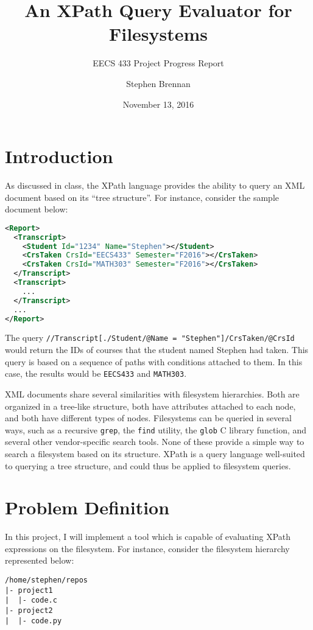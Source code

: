 \documentclass{scrartcl}
\title{An XPath Query Evaluator for Filesystems}
\subtitle{EECS 433 Project Progress Report}
\date{November 13, 2016}
\author{Stephen Brennan}
\begin{document}
\maketitle

\section{Introduction}
As discussed in class, the XPath language provides the ability to query an XML
document based on its ``tree structure''. For instance, consider the sample
document below:

\begin{lstlisting}[language=XML]
<Report>
  <Transcript>
    <Student Id="1234" Name="Stephen"></Student>
    <CrsTaken CrsId="EECS433" Semester="F2016"></CrsTaken>
    <CrsTaken CrsId="MATH303" Semester="F2016"></CrsTaken>
  </Transcript>
  <Transcript>
    ...
  </Transcript>
  ...
</Report>
\end{lstlisting}

The query \texttt{//Transcript[./Student/@Name = "Stephen"]/CrsTaken/@CrsId}
would return the IDs of courses that the student named Stephen had taken. This
query is based on a sequence of paths with conditions attached to them. In this
case, the results would be \texttt{EECS433} and \texttt{MATH303}.

XML documents share several similarities with filesystem hierarchies. Both are
organized in a tree-like structure, both have attributes attached to each node,
and both have different types of nodes. Filesystems can be queried in several
ways, such as a recursive \texttt{grep}, the \texttt{find} utility, the
\texttt{glob} C library function, and several other vendor-specific search
tools. None of these provide a simple way to search a filesystem based on its
structure. XPath is a query language well-suited to querying a tree structure,
and could thus be applied to filesystem queries.

\section{Problem Definition}

In this project, I will implement a tool which is capable of evaluating XPath
expressions on the filesystem. For instance, consider the filesystem hierarchy
represented below:

\begin{lstlisting}
/home/stephen/repos
|- project1
|  |- code.c
|- project2
|  |- code.py
\end{lstlisting}
\end{document}
